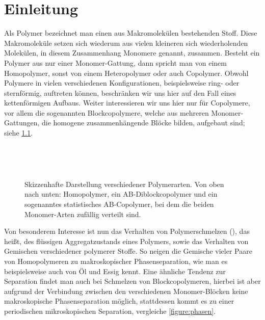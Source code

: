 
\chapter{Einleitung} %
\label{chapter:einleitung}

Als Polymer bezeichnet man einen aus Makromolekülen bestehenden Stoff.
Diese Makromoleküle setzen sich wiederum aus vielen kleineren sich wiederholenden Molekülen, in diesem Zusammenhang Monomere genannt, zusammen.
Besteht ein Polymer aus nur einer Monomer-Gattung, dann spricht man von einem Homopolymer, sonst von einem Heteropolymer oder auch Copolymer.
Obwohl Polymere in vielen verschiedenen Konfigurationen, beispielsweise ring- oder sternförmig, auftreten können, beschränken wir uns hier auf den Fall eines kettenförmigen Aufbaus.
Weiter interessieren wir uns hier nur für Copolymere, vor allem die sogenannten Blockcopolymere, welche aus mehreren Monomer-Gattungen, die homogene zusammenhängende Blöcke bilden, aufgebaut sind; siehe \cref{figure:polymerketten}.

\begin{figure}[tb]
    \centering
    \begin{subfigure}[b]{\textwidth}
        \centering
        
    \end{subfigure}
    \\[0.33em]
    \begin{subfigure}[b]{\textwidth}
        \centering
        
    \end{subfigure}
    \\[0.33em]
    \begin{subfigure}[b]{\textwidth}
        \centering
        
    \end{subfigure}
    \caption[Skizzenhafte Darstellung verschiedener Polymerarten]{%
        Skizzenhafte Darstellung verschiedener Polymerarten.
        Von oben nach unten: Homopolymer, ein AB-Diblockcopolymer und ein sogenanntes statistisches AB-Copolymer, bei dem die beiden Monomer-Arten zufällig verteilt sind.
    }
    \label{figure:polymerketten}
\end{figure}

Von besonderem Interesse ist nun das Verhalten von Polymerschmelzen (), das heißt, des flüssigen Aggregatzustands eines Polymers, sowie das Verhalten von Gemischen verschiedener polymerer Stoffe.
So neigen die Gemische vieler Paare von Homopolymeren zu makroskopischer Phasenseparation, wie man es beispielsweise auch von Öl und Essig kennt.
Eine ähnliche Tendenz zur Separation findet man auch bei Schmelzen von Blockcopolymeren, hierbei ist aber aufgrund der Verbindung zwischen den verschiedenen Monomer-Blöcken keine makroskopische Phasenseparation möglich, stattdessen kommt es zu einer periodischen mikroskopischen Separation, vergleiche \cref{figure:phasen}.

